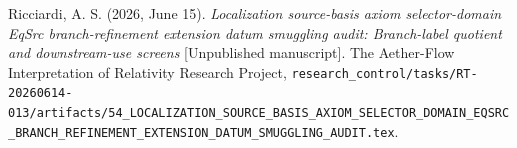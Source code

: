\documentclass[11pt]{article}
\begin{document}
Ricciardi, A. S. (2026, June 15). \emph{Localization source-basis axiom
selector-domain EqSrc branch-refinement extension datum smuggling audit:
Branch-label quotient and downstream-use screens} [Unpublished
manuscript]. The Aether-Flow Interpretation of Relativity Research
Project,
\texttt{research\_control/tasks/RT-20260614-013/artifacts/54\_LOCALIZATION\_SOURCE\_BASIS\_AXIOM\_SELECTOR\_DOMAIN\_EQSRC\_BRANCH\_REFINEMENT\_EXTENSION\_DATUM\_SMUGGLING\_AUDIT.tex}.
\end{document}
